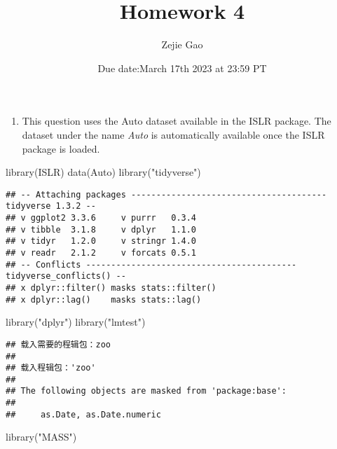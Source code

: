 \documentclass[
]{article}
\title{Homework 4}
\author{Zejie Gao}
\date{Due date:March 17th 2023 at 23:59 PT}
\newenvironment{Shaded}{\begin{snugshade}}{\end{snugshade}}
\newcommand{\FunctionTok}[1]{\textcolor[rgb]{0.00,0.00,0.00}{#1}}
\newcommand{\NormalTok}[1]{#1}
\newcommand{\StringTok}[1]{\textcolor[rgb]{0.31,0.60,0.02}{#1}}
\providecommand{\tightlist}{%
  \setlength{\itemsep}{0pt}\setlength{\parskip}{0pt}}
\begin{document}
\maketitle

\begin{enumerate}
\def\labelenumi{\arabic{enumi}.}
\tightlist
\item
  This question uses the Auto dataset available in the ISLR package. The
  dataset under the name \emph{Auto} is automatically available once the
  ISLR package is loaded.
\end{enumerate}

\begin{Shaded}
\begin{Highlighting}[]
\FunctionTok{library}\NormalTok{(ISLR)}
\FunctionTok{data}\NormalTok{(Auto)}
\FunctionTok{library}\NormalTok{(}\StringTok{"tidyverse"}\NormalTok{)}
\end{Highlighting}
\end{Shaded}

\begin{verbatim}
## -- Attaching packages --------------------------------------- tidyverse 1.3.2 --
## v ggplot2 3.3.6     v purrr   0.3.4
## v tibble  3.1.8     v dplyr   1.1.0
## v tidyr   1.2.0     v stringr 1.4.0
## v readr   2.1.2     v forcats 0.5.1
## -- Conflicts ------------------------------------------ tidyverse_conflicts() --
## x dplyr::filter() masks stats::filter()
## x dplyr::lag()    masks stats::lag()
\end{verbatim}

\begin{Shaded}
\begin{Highlighting}[]
\FunctionTok{library}\NormalTok{(}\StringTok{"dplyr"}\NormalTok{)}
\FunctionTok{library}\NormalTok{(}\StringTok{"lmtest"}\NormalTok{)}
\end{Highlighting}
\end{Shaded}

\begin{verbatim}
## 载入需要的程辑包：zoo
## 
## 载入程辑包：'zoo'
## 
## The following objects are masked from 'package:base':
## 
##     as.Date, as.Date.numeric
\end{verbatim}

\begin{Shaded}
\begin{Highlighting}[]
\FunctionTok{library}\NormalTok{(}\StringTok{"MASS"}\NormalTok{)}
\end{Highlighting}
\end{Shaded}
\end{document}
